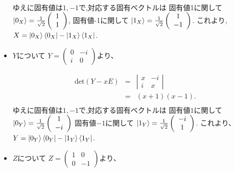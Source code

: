 \begin{itemize}
\begin{eqnarray*}
\end{eqnarray*}
ゆえに固有値は$1, -1$で,対応する固有ベクトルは
\newline
固有値1に関して
$\ket{0_X} = \frac{1}{\sqrt{2}}
\left( \begin{array}{c}
	1\\
	1
	\end{array}
\right)
$,
固有値-1に関して
$\ket{1_X} = \frac{1}{\sqrt{2}}
\left( \begin{array}{c}
	1\\
	-1
	\end{array}
\right)
$.
\newline
これより,
$X = \ket{0_X}\bra{0_X} - \ket{1_X}\bra{1_X}$.
\newline
\item $Y$について
$Y = \left(
	\begin{array}{cc}
	0&-i\\
	i&0
	\end{array}
\right)
$より、

\begin{eqnarray*}
\mathrm{det}(Y - xE) &=& \left| \begin{array}{cc}
	x & -i\\
	i & x
	\end{array}
	\right|\\
	&=& (x + 1)(x - 1).\\
\end{eqnarray*}
ゆえに固有値は$1, -1$で,対応する固有ベクトルは
\newline
固有値$1$に関して
$\ket{0_Y} = \frac{1}{\sqrt{2}}
\left( \begin{array}{c}
	1\\
	-i
	\end{array}
\right)
$
固有値$-1$に関して
$\ket{1_Y} = \frac{1}{\sqrt{2}}
\left( \begin{array}{c}
	-i\\
	1
	\end{array}
\right)
$.
\newline
これより、
$Y = \ket{0_Y}\bra{0_Y} - \ket{1_Y}\bra{1_Y}$.
\newline
\item $Z$について
$
Z = \left(
	\begin{array}{cc}
	1&0\\
	0&-1
	\end{array}
\right)
$より、


\end{itemize}
